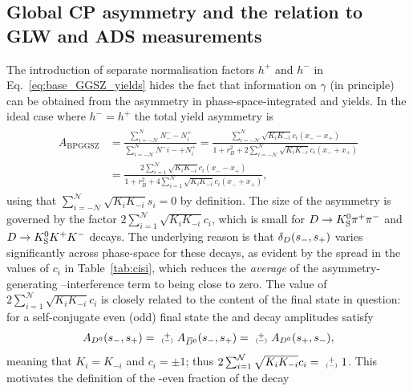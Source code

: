 
\subsection{Global CP asymmetry and the relation to GLW and ADS measurements} %
\label{sub:relation_to_glw_and_ads_measurements}



The introduction of separate normalisation factors $h^+$ and $h^-$ in Eq.~\eqref{eq:base_GGSZ_yields} hides the fact that information on $\gamma$ (in principle) can be obtained from the asymmetry in phase-space-integrated \Bp and \Bm yields. In the ideal case where $h^-=h^+$ the total yield asymmetry is 
\begin{align}\begin{split}\label{eq:A_GGSZ_global}
    A_\mathrm{BPGGSZ} &= \frac{\sum_{i=-\mathcal N}^{\mathcal N} N^-_- - N^+_i}{\sum_{i=-\mathcal N}^{\mathcal N} N^-i- + N^+_i}
    = \frac{ \sum_{i=-\mathcal N}^{\mathcal N} \sqrt{K_iK_{-i}}c_i (x_- - x_+)}{1 + r_B^2 +2 \sum_{i=-\mathcal N}^{\mathcal N} \sqrt{K_iK_{-i}}c_i (x_- + x_+)} \\
    &=\frac{2 \sum_{i=1}^{\mathcal N} \sqrt{K_iK_{-i}}c_i (x_- - x_+)}{1 + r_B^2 +4 \sum_{i=1}^{\mathcal N} \sqrt{K_iK_{-i}}c_i (x_- + x_+) },
\end{split}\end{align}
using that $\sum_{i=-\mathcal N}^{\mathcal N} \sqrt{K_iK_{-i}}s_i=0$ by definition. The size of the asymmetry is governed by the factor $2\sum_{i=1}^{\mathcal N} \sqrt{K_iK_{-i}}c_i$, which is small for ${{D}\rightarrow{\ensuremath{{K}^0_{\mathrm{S}}}}{\ensuremath{{\pi}^+}}{\ensuremath{{\pi}^-}}}$ and ${{D}\rightarrow{\ensuremath{{K}^0_{\mathrm{S}}}}{\ensuremath{{K}^+}}{\ensuremath{{K}^-}}}$ decays. The underlying reason is that $\delta_D(s_-, s_+)$ varies significantly across phase-space for these decays, as evident by the spread in the values of $c_i$ in Table~\ref{tab:cisi}, which reduces the \emph{average} of the asymmetry-generating \Dz--\Dzb interference term to being close to zero. The value of $2\sum_{i=1}^{\mathcal N} \sqrt{K_iK_{-i}}c_i$ is closely related to the \CP content of the final state in question: for a self-conjugate \CP even (odd) final state the \Dz and \Dzb decay amplitudes satisfy
\begin{align}
    {A_\Dz(\sm, \sp)=\varpm A_\Dzb(\sm, \sp)=\varpm A_\Dz(\sp, \sm)},
\end{align}
 meaning that $K_i=K_{-i}$ and $c_i=\pm1$; thus $2\sum_{i=1}^{\mathcal N} \sqrt{K_iK_{-i}}c_i= \varpm 1$. This motivates the definition of the \CP-even fraction of the decay
